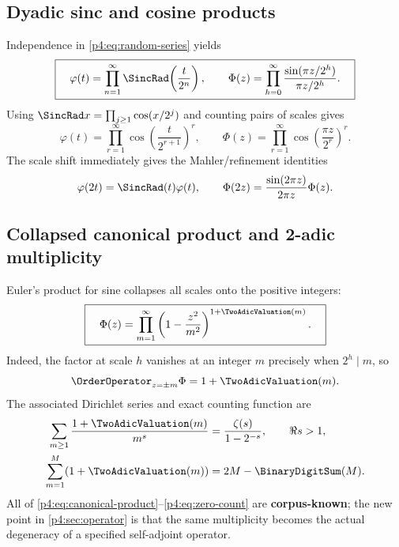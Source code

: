 \documentclass[11pt]{article}
\theoremstyle{definition}
\theoremstyle{remark}
\newcommand{\PhiF}{\Phi}
\newcommand{\phiF}{\varphi}
\newcommand{\CorpusKnown}{\textcolor{linkblue}{\textbf{corpus-known}}}
\begin{document}
\subsection{Dyadic sinc and cosine products}

Independence in \eqref{p4:eq:random-series} yields
\begin{equation}
 \boxed{\quad
 \phiF(t)=\prod_{n=1}^{\infty}\SincRad\!\left(\frac{t}{2^n}\right),
 \qquad
 \PhiF(z)=\prod_{h=0}^{\infty}
 \frac{\sin(\pi z/2^h)}{\pi z/2^h}.
 \quad}
 \label{p4:eq:sinc-products}
\end{equation}
Using \(\SincRad x=\prod_{j\ge1}\cos(x/2^j)\) and counting pairs of scales gives
\begin{equation}
 \phiF(t)=\prod_{r=1}^{\infty}
 \cos\!\left(\frac{t}{2^{r+1}}\right)^r,
 \qquad
 \PhiF(z)=\prod_{r=1}^{\infty}
 \cos\!\left(\frac{\pi z}{2^r}\right)^r.
 \label{p4:eq:cosine-products}
\end{equation}
The scale shift immediately gives the Mahler/refinement identities
\begin{equation}
 \phiF(2t)=\SincRad(t)\phiF(t),
 \qquad
 \PhiF(2z)=\frac{\sin(2\pi z)}{2\pi z}\PhiF(z).
 \label{p4:eq:phi-scaling}
\end{equation}

\subsection{Collapsed canonical product and 2-adic multiplicity}

Euler's product for sine collapses all scales onto the positive integers:
\begin{equation}
 \boxed{\quad
 \PhiF(z)=\prod_{m=1}^{\infty}
 \left(1-\frac{z^2}{m^2}\right)^{1+\TwoAdicValuation(m)}.
 \quad}
 \label{p4:eq:canonical-product}
\end{equation}
Indeed, the factor at scale \(h\) vanishes at an integer \(m\) precisely when
\(2^h\mid m\), so
\begin{equation}
 \OrderOperator_{z=\pm m}\PhiF=1+\TwoAdicValuation(m).
 \label{p4:eq:zero-multiplicity}
\end{equation}
The associated Dirichlet series and exact counting function are
\begin{align}
 \sum_{m\ge1}\frac{1+\TwoAdicValuation(m)}{m^s}
 &=\frac{\zeta(s)}{1-2^{-s}},\qquad \Re s>1,
 \label{p4:eq:zero-zeta}\\
 \sum_{m=1}^{M}(1+\TwoAdicValuation(m))
 &=2M-\BinaryDigitSum(M).
 \label{p4:eq:zero-count}
\end{align}
All of \eqref{p4:eq:canonical-product}--\eqref{p4:eq:zero-count} are \CorpusKnown{}; the
new point in \cref{p4:sec:operator} is that the same multiplicity becomes the actual
degeneracy of a specified self-adjoint operator.
\end{document}
